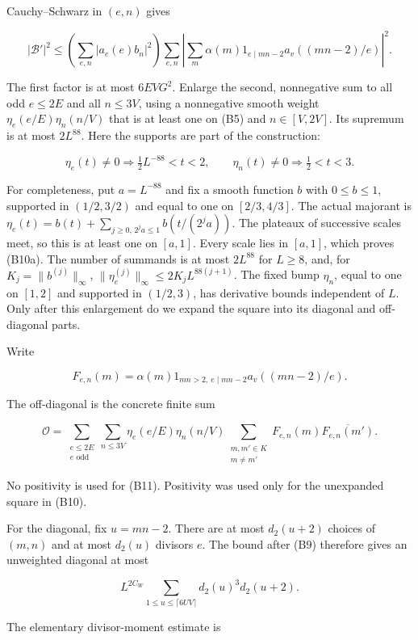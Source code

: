 Cauchy--Schwarz in \((e,n)\) gives

\[
|\mathcal B'|^2\le
\left(\sum_{e,n}|a_e(e)b_n|^2\right)
\sum_{e,n}\left|
 \sum_m\alpha(m)1_{e\mid mn-2}a_v((mn-2)/e)\right|^2.
\tag{B10}
\]

The first factor is at most \(6EVG^2\). Enlarge the second, nonnegative
sum to all odd \(e\le2E\) and all \(n\le3V\), using a nonnegative smooth
weight \(\eta_e(e/E)\eta_n(n/V)\) that is at least one on (B5) and
\(n\in[V,2V]\). Its supremum is at most \(2L^{88}\). Here the supports
are part of the construction:

\[
\eta_e(t)\ne0\Longrightarrow \tfrac12L^{-88}<t<2,
\qquad
\eta_n(t)\ne0\Longrightarrow \tfrac12<t<3. \tag{B10a}
\]

For completeness, put \(a=L^{-88}\) and fix a smooth function \(b\) with
\(0\le b\le1\), supported in \((1/2,3/2)\) and equal to one on
\([2/3,4/3]\). The actual majorant is
\(\eta_e(t)=b(t)+\sum_{j\ge0,\,2^ja\le1}b(t/(2^ja))\). The plateaux of
successive scales meet, so this is at least one on \([a,1]\). Every
scale lies in \([a,1]\), which proves (B10a). The number of summands is
at most \(2L^{88}\) for \(L\ge8\), and, for \(K_j=\|b^{(j)}\|_\infty\),
\(\|\eta_e^{(j)}\|_\infty\le2K_jL^{88(j+1)}\). The fixed bump
\(\eta_n\), equal to one on \([1,2]\) and supported in \((1/2,3)\), has
derivative bounds independent of \(L\). Only after this enlargement do
we expand the square into its diagonal and off-diagonal parts.

Write

\[
F_{e,n}(m)=\alpha(m)1_{mn>2,\ e\mid mn-2}a_v((mn-2)/e).
\]

The off-diagonal is the concrete finite sum

\[
\mathcal O=\sum_{\substack{e\le2E\\e\text{ odd}}}\sum_{n\le3V}
 \eta_e(e/E)\eta_n(n/V)
 \sum_{\substack{m,m'\in K\\m\ne m'}}
 F_{e,n}(m)\overline{F_{e,n}(m')}. \tag{B11}
\]

No positivity is used for (B11). Positivity was used only for the
unexpanded square in (B10).

For the diagonal, fix \(u=mn-2\). There are at most \(d_2(u+2)\) choices
of \((m,n)\) and at most \(d_2(u)\) divisors \(e\). The bound after (B9)
therefore gives an unweighted diagonal at most

\[
L^{2C_W}\sum_{1\le u\le\lceil6UV\rceil}d_2(u)^3d_2(u+2).
\]

The elementary divisor-moment estimate is

